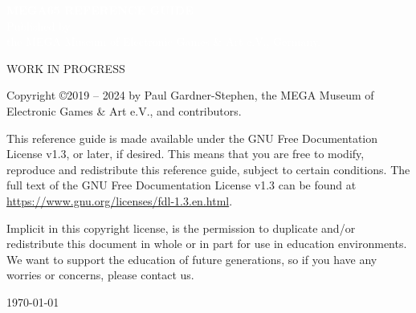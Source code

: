 





\cleardoublepage


\begin{titlepage}
    \pagecolor{blue}
     \begin{center}
       {
         \large
         \vspace*{2cm}
               {\Huge\textcolor{white}{\bf{MEGA65 REFERENCE GUIDE}}}\\
             \vspace{\fill}
                    {\textcolor{white}
                    {Published by \\ the MEGA Museum of Electronic Games \& Art e.V., Germany.}}
       }
     \end{center}
   \end{titlepage}

  \pagecolor{white}\textcolor{black}
  \vfill
  WORK IN PROGRESS

  Copyright \copyright 2019 -- 2024 by Paul Gardner-Stephen,
  the MEGA Museum of Electronic Games \& Art e.V.,
  and contributors.

  This reference guide is made available under the GNU Free Documentation
  License v1.3, or later, if desired. This means that you are free to
  modify, reproduce and redistribute this reference guide, subject to
  certain conditions. The full text of the GNU Free Documentation
  License v1.3 can be found at
  \url{https://www.gnu.org/licenses/fdl-1.3.en.html}.

  Implicit in this copyright license, is the permission to duplicate
  and/or redistribute this document in whole or in part for use in
  education environments. We want to support the education of future
  generations, so if you have any worries or concerns, please contact us.

   \par\today

